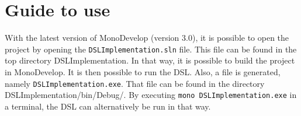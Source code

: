 \section{Guide to use}
With the latest version of MonoDevelop (version 3.0), it is possible to open the project by opening the \texttt{DSLImplementation.sln} file. This file can be found in the top directory DSLImplementation. In that way, it is possible to build the project in MonoDevelop. It is then possible to run the DSL. Also, a file is generated, namely \texttt{DSLImplementation.exe}. That file can be found in the directory DSLImplementation/bin/Debug/. By executing \texttt{mono DSLImplementation.exe} in a terminal, the DSL can alternatively be run in that way.